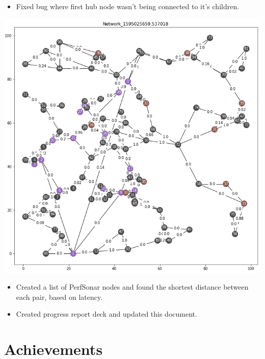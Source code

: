 \documentclass{weeklyreport}
\begin{document}
\subsection*{}

\begin{itemize}
	\item Fixed bug where first hub node wasn't being connected to it's children.
\end{itemize}

    {\centering \includegraphics[width=\linewidth]{week_2/NetworkZero.png}}

\begin{itemize}
    \item Created a list of PerfSonar nodes and found the shortest distance between each pair, based on latency.
    \item Created progress report deck and updated this document.
\end{itemize}

\section*{Achievements}
\end{document}
